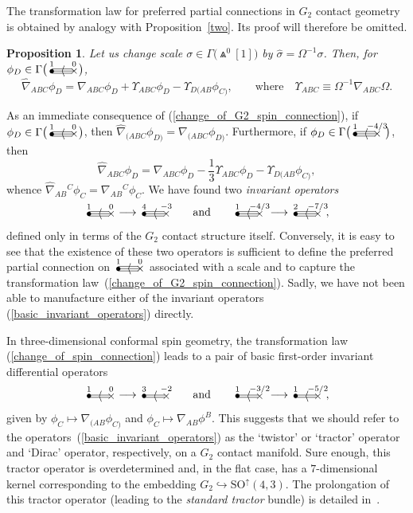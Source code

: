 \documentclass[10pt,a4paper]{amsart}
\numberwithin{equation}{section}
\newtheorem{prop}[Theorem]{Proposition}
 { \theoremstyle{definition}
\newtheorem{Definition}[Theorem]{Definition}
\newtheorem{Note}[Theorem]{Note}
\newtheorem{Example}[Theorem]{Example}
\newtheorem{Remark}[Theorem]{Remark} }
\newcommand{\btwo}[2]{\begin{picture}(28,11)
\put(4,1.5){\makebox(0,0){$\bullet$}}
\put(24,1.5){\makebox(0,0){$\times$}}
\put(23,2.5){\line(-1,0){20}}
\put(23,0.5){\line(-1,0){20}}
\put(14,1.5){\makebox(0,0){$\langle$}}
\put(4,8){\makebox(0,0){$\scriptstyle #1$}}
\put(24,8){\makebox(0,0){$\scriptstyle #2$}}
\end{picture}}
\newcommand{\gtwo}[2]{\begin{picture}(28,10)
\put(4,1.1){\makebox(0,0){$\bullet$}}
\put(24,1.5){\makebox(0,0){$\times$}}
\put(4,3.5){\line(1,0){18}}
\put(4,1.5){\line(1,0){20}}
\put(4,-.5){\line(1,0){18}}
\put(14,1.5){\makebox(0,0){$\langle$}}
\put(4,8){\makebox(0,0){$\scriptstyle #1$}}
\put(24,8){\makebox(0,0){$\scriptstyle #2$}}
\end{picture}}
\begin{document}
The transformation law for preferred partial connections in $G_2$ contact
geometry is obtained by analogy with Proposition~\ref{two}. Its proof will
therefore be omitted.
\begin{prop} Let us change scale $\sigma\in\Gamma\big({\Wedge}^0[1]\big)$ by
$\widehat\sigma=\Omega^{-1}\sigma$. Then, for $\phi_D\in\Gamma\big(\gtwo{1}{0}\big)$,
\begin{equation}\label{change_of_G2_spin_connection}
\widehat\nabla_{ABC}\phi_D=\nabla_{ABC}\phi_D+\Upsilon_{ABC}\phi_D
-\Upsilon_{D(AB}\phi_{C)},\qquad\mbox{where} \quad
\Upsilon_{ABC}\equiv\Omega^{-1}\nabla_{ABC}\Omega.\end{equation}
\end{prop}
As an immediate consequence of (\ref{change_of_G2_spin_connection}), if
$\phi_D\in\Gamma\big(\gtwo{1}{0}\big)$, then
$\widehat\nabla_{(ABC}\phi_{D)}=\nabla_{(ABC}\phi_{D)}$. Furthermore, if
$\phi_D\in\Gamma\big(\gtwo{1}{-4/3}\ \big)$, then
\[\textstyle\widehat\nabla_{ABC}\phi_D
=\nabla_{ABC}\phi_D-\frac13\Upsilon_{ABC}\phi_D-\Upsilon_{D(AB}\phi_{C)},\]
whence $\widehat\nabla_{AB}{}^C\phi_C=\nabla_{AB}{}^C\phi_C$. We have found
two {\em invariant operators}
\begin{equation}\label{basic_invariant_operators}
\gtwo{1}{0}\longrightarrow\gtwo{4}{-3}\qquad\mbox{and}\qquad
\gtwo{1}{-4/3}\;\longrightarrow\gtwo{2}{-7/3}\ ,\end{equation}
defined only in terms of the $G_2$ contact structure itself. Conversely, it is
easy to see that the existence of these two operators is sufficient to define
the preferred partial connection on $\gtwo{1}{0}$ associated with a scale and
to capture the transformation law~(\ref{change_of_G2_spin_connection}).
Sadly, we have not been able to manufacture either of the invariant operators
(\ref{basic_invariant_operators}) directly.

In three-dimensional conformal spin geometry, the transformation law
(\ref{change_of_spin_connection}) leads to a pair of basic first-order
invariant differential operators
\[\btwo{1}{0}\longrightarrow\btwo{3}{-2}\qquad\mbox{and}\qquad
\btwo{1}{-3/2}\;\longrightarrow\btwo{1}{-5/2}\ ,\]
given by $\phi_C\mapsto\nabla_{(AB}\phi_{C)}$ and
$\phi_C\mapsto\nabla_{AB}\phi^B$. This suggests that we should refer to the
opera\-tors~(\ref{basic_invariant_operators}) as the `twistor' or `tractor'
operator and `Dirac' operator, respectively, on a $G_2$ contact manifold. Sure
enough, this tractor operator is overdetermined and, in the flat case, has a
$7$-dimensional kernel corresponding to the embedding
$G_2\hookrightarrow{\mathrm{SO}}^\uparrow(4,3)$. The prolongation of this
tractor operator (leading to the {\em standard tractor} bundle) is detailed
in~\cite{Moy}.
\end{document}
